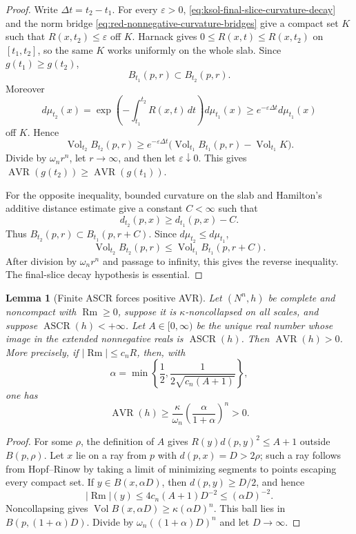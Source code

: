 \documentclass[10pt]{coll-l}
\newtheorem{lemma}[theorem]{Lemma}
\theoremstyle{definition}
\theoremstyle{remark}
\numberwithin{section}{chapter}
\numberwithin{equation}{chapter}
\newcommand{\ASCR}{\operatorname{ASCR}}
\newcommand{\AVR}{\operatorname{AVR}}
\newcommand{\Rm}{\operatorname{Rm}}
\newcommand{\Vol}{\operatorname{Vol}}
\begin{document}
\begin{proof}
Write $\Delta t=t_2-t_1$.  For every $\varepsilon>0$,
\eqref{eq:ksol-final-slice-curvature-decay} and the norm bridge
\eqref{eq:red-nonnegative-curvature-bridges} give a compact set $K$ such
that $R(x,t_2)\leq\varepsilon$ off $K$.  Harnack gives
$0\leq R(x,t)\leq R(x,t_2)$ on $[t_1,t_2]$, so the same $K$ works
uniformly on the whole slab.  Since $g(t_1)\geq g(t_2)$,
\[
                         B_{t_1}(p,r)\subset B_{t_2}(p,r).
\]
Moreover
\[
 d\mu_{t_2}(x)
 =\exp\!\left(-\int_{t_1}^{t_2}R(x,t)\,dt\right)d\mu_{t_1}(x)
 \geq e^{-\varepsilon\Delta t}d\mu_{t_1}(x)
\]
off $K$.  Hence
\[
 \Vol_{t_2}B_{t_2}(p,r)
 \geq e^{-\varepsilon\Delta t}
      \bigl(\Vol_{t_1}B_{t_1}(p,r)-\Vol_{t_1}K\bigr).
\]
Divide by $\omega_nr^n$, let $r\to\infty$, and then let
$\varepsilon\downarrow0$.  This gives
$\AVR(g(t_2))\geq\AVR(g(t_1))$.

For the opposite inequality, bounded curvature on the slab and Hamilton's
additive distance estimate give a constant $C<\infty$ such that
\[
 d_{t_2}(p,x)\geq d_{t_1}(p,x)-C.
\]
Thus $B_{t_2}(p,r)\subset B_{t_1}(p,r+C)$.  Since
$d\mu_{t_2}\leq d\mu_{t_1}$,
\[
 \Vol_{t_2}B_{t_2}(p,r)\leq\Vol_{t_1}B_{t_1}(p,r+C).
\]
After division by $\omega_nr^n$ and passage to infinity, this gives the
reverse inequality.  The final-slice decay hypothesis is essential.
\end{proof}

\begin{lemma}[Finite ASCR forces positive AVR]
\label{lem:ksol-finite-ASCR-positive-AVR}
Let $(N^n,h)$ be complete and noncompact with $\Rm\geq0$, suppose it is
$\kappa$-noncollapsed on all scales, and suppose $\ASCR(h)<+\infty$.
Let $A\in[0,\infty)$ be the unique real number whose image in the extended
nonnegative reals is $\ASCR(h)$.  Then $\AVR(h)>0$.  More precisely, if
$|\Rm|\leq c_nR$, then, with
\begin{equation}
 \alpha=\min\left\{\frac12,
       \frac1{2\sqrt{c_n(A+1)}}\right\},              \label{eq:ksol-ASCR-alpha}
\end{equation}
one has
\begin{equation}
       \AVR(h)\geq\frac{\kappa}{\omega_n}
          \left(\frac{\alpha}{1+\alpha}\right)^n>0.  \label{eq:ksol-finite-ASCR-AVR-bound}
\end{equation}
\end{lemma}

\begin{proof}
For some $\rho$, the definition of $A$ gives
$R(y)d(p,y)^2\leq A+1$ outside $B(p,\rho)$.  Let $x$ lie on a ray from
$p$ with $d(p,x)=D>2\rho$; such a ray follows from Hopf--Rinow by taking a
limit of minimizing segments to points escaping every compact set.  If
$y\in B(x,\alpha D)$, then
$d(p,y)\geq D/2$, and hence
\[
 |\Rm|(y)\leq4c_n(A+1)D^{-2}\leq(\alpha D)^{-2}.
\]
Noncollapsing gives $\Vol B(x,\alpha D)\geq\kappa(\alpha D)^n$.
This ball lies in $B(p,(1+\alpha)D)$.  Divide by
$\omega_n((1+\alpha)D)^n$ and let $D\to\infty$.
\end{proof}
\end{document}
